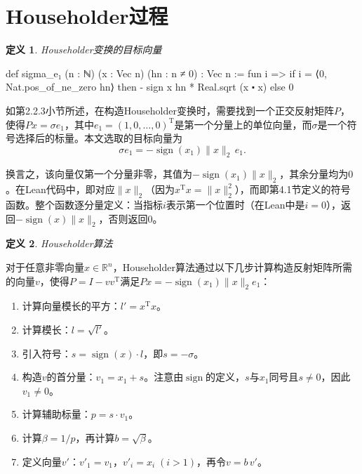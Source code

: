 ﻿\documentclass[UTF8,a4paper,openany]{ctexbook}
\DeclareMathOperator{\sign}{sign}
\theoremstyle{qrplain}
\newtheorem{definition}{定义}[chapter]
\begin{document}
\section{Householder过程}

\begin{definition}
  Householder变换的目标向量
\end{definition}
\begin{leancode}
  def sigma_e₁ (n : ℕ) (x : Vec n) (hn : n ≠ 0) : Vec n := 
    fun i => if i = ⟨0, Nat.pos_of_ne_zero hn⟩ 
                 then - sign x hn * Real.sqrt (x ⬝ x) else 0
\end{leancode}

如第2.2.3小节所述，在构造Householder变换时，需要找到一个正交反射矩阵$P$，使得$Px=\sigma e_1$，其中$e_1=(1,0,\dots,0)^\mathrm{T}$是第一个分量上的单位向量，而$\sigma$是一个符号选择后的标量。本文选取的目标向量为
$$
\sigma e_1 = -\sign(x_1)\|x\|_2\,e_1.
$$

换言之，该向量仅第一个分量非零，其值为$-\sign(x_1)\|x\|_2$，其余分量均为$0$。在Lean代码中，即对应$\|x\|_2$（因为$x^\mathrm{T}x=\|x\|_2^2$），而即第4.1节定义的符号函数。整个函数逐分量定义：当指标$i$表示第一个位置时（在Lean中是$i=0$），返回$-\sign(x)\|x\|_2$，否则返回$0$。

\begin{definition}
\label{def:householder}
  Householder算法
\end{definition}

对于任意非零向量$x\in\mathbb{R}^n$，Householder算法通过以下几步计算构造反射矩阵所需的向量$v$，使得$P=I-vv^\mathrm{T}$满足$Px=-\sign(x_1)\|x\|_2e_1$：

\begin{enumerate}
  \item 计算向量模长的平方：$l' = x^\mathrm{T}x$。
  \item 计算模长：$l = \sqrt{l'}$。
  \item 引入符号：$s = \sign(x)\cdot l$，即$s = -\sigma$。
  \item 构造$v$的首分量：$v_1 = x_1 + s$。注意由$\sign$的定义，$s$与$x_1$同号且$s\neq 0$，因此$v_1\neq0$。
  \item 计算辅助标量：$p = s\cdot v_1$。
  \item 计算$\beta = 1/p$，再计算$b = \sqrt{\beta}$。
  \item 定义向量$v'$：$v'_1=v_1$，$v'_i=x_i\;(i>1)$，再令$v = b\,v'$。
\end{enumerate}
\end{document}
